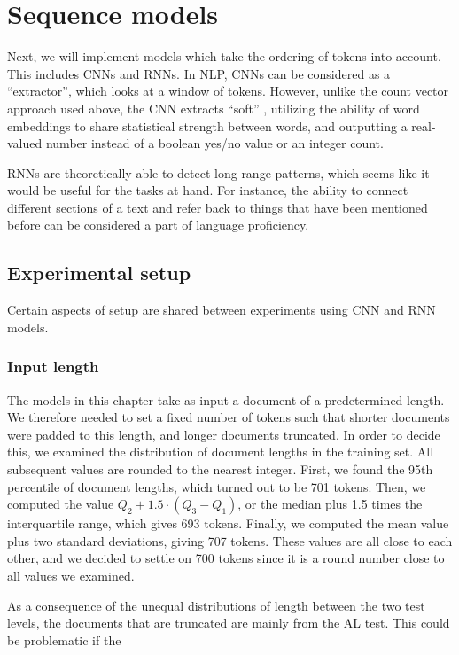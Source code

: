 \chapter{Sequence models}

Next, we will implement models which take the ordering of tokens into
account. This includes \acp{CNN} and \acp{RNN}. In \ac{NLP}, \acp{CNN} can be
considered as a ``\ngram extractor'', which looks at a window of tokens.
However, unlike the count vector approach used above, the CNN extracts
``soft'' \ngrams, utilizing the ability of word embeddings to share
statistical strength between words, and outputting a real-valued number
instead of a boolean yes/no value or an integer count.

\acp{RNN} are theoretically able to detect long range patterns, which seems
like it would be useful for the tasks at hand. For instance, the ability to
connect different sections of a text and refer back to things that have been
mentioned before can be considered a part of language proficiency.


\section{Experimental setup}

Certain aspects of setup are shared between experiments using \ac{CNN} and
\ac{RNN} models.

\subsection{Input length}

The models in this chapter take as input a document of a predetermined
length. We therefore needed to set a fixed number of tokens such that shorter
documents were padded to this length, and longer documents truncated. In
order to decide this, we examined the distribution of document lengths in the
training set. All subsequent values are rounded to the nearest integer.
First, we found the 95th percentile of document lengths, which turned out to
be 701 tokens. Then, we computed the value $Q_2 + 1.5 \cdot (Q_3 - Q_1)$, or
the median plus 1.5 times the interquartile range, which gives 693 tokens.
Finally, we computed the mean value plus two standard deviations, giving 707
tokens. These values are all close to each other, and we decided to settle on
700 tokens since it is a round number close to all values we examined.

As a consequence of the unequal distributions of length between the two test
levels, the documents that are truncated are mainly from the AL test. This
could be problematic if the 


